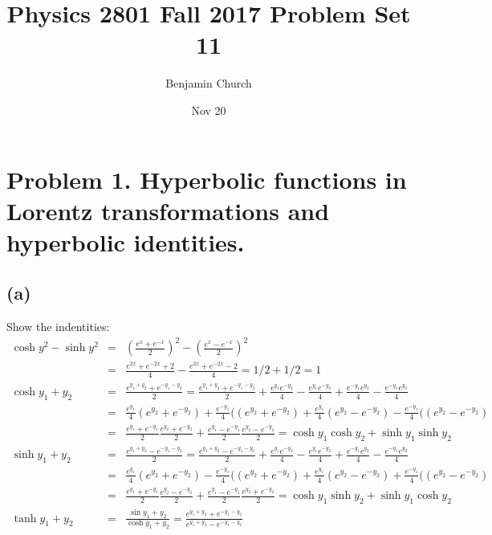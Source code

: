 \documentclass[11pt]{amsart}
\title{Physics 2801 Fall 2017 Problem Set 11}
\author{Benjamin Church}
\date{Nov 20} %
\begin{document}
\maketitle

\section*{Problem 1. Hyperbolic functions in Lorentz transformations and hyperbolic identities.}
\subsection*{(a)}
 Show the indentities: \\
\begin{eqnarray*}
\cosh{y}^{2}-\sinh{y}^{2} &=& (\frac{e^{x}+e^{-x}}{2})^{2}- (\frac{e^{x}-e^{-x}}{2})^{2} \\
&=& \frac{e^{2x}+e^{-2x}+2}{4}-\frac{e^{2x}+e^{-2x}-2}{4} = 1/2+1/2 = 1 \\
\cosh{y_{1}+y_{2}} &=& \frac{e^{y_{1}+y_{2}}+e^{-y_{1}-y_{2}}}{2} =  \frac{e^{y_{1}+y_{2}}+e^{-y_{1}-y_{2}}}{2}+\frac{e^{y_{1}}e^{-y_{2}}}{4}-\frac{e^{y_{1}}e^{-y_{2}}}{4} +\frac{e^{-y_{1}}e^{y_{2}}}{4} -\frac{e^{-y_{1}}e^{y_{2}}}{4}\\
&=& \frac{e^{y_{1}}}{4}(e^{y_{2}}+e^{-y_{2}})+\frac{e^{-y_{1}}}{4}((e^{y_{2}}+e^{-y_{2}})+\frac{e^{y_{1}}}{4}(e^{y_{2}}-e^{-y_{2}})-\frac{e^{-y_{1}}}{4}((e^{y_{2}}-e^{-y_{2}})\\
&=& \frac{e^{y_{1}}+e^{-y_{1}}}{2}\frac{e^{y_{2}}+e^{-y_{2}}}{2}+ \frac{e^{y_{1}}-e^{-y_{1}}}{2}\frac{e^{y_{2}}-e^{-y_{2}}}{2} = \cosh{y_{1}}\cosh{y_{2}}+\sinh{y_{1}}\sinh{y_{2}} \\
\sinh{y_{1}+y_{2}} &=& \frac{e^{y_{1}+y_{2}}-e^{-y_{1}-y_{2}}}{2} =  \frac{e^{y_{1}+y_{2}}-e^{-y_{1}-y_{2}}}{2}+\frac{e^{y_{1}}e^{-y_{2}}}{4}-\frac{e^{y_{1}}e^{-y_{2}}}{4} +\frac{e^{-y_{1}}e^{y_{2}}}{4} -\frac{e^{-y_{1}}e^{y_{2}}}{4}\\
&=& \frac{e^{y_{1}}}{4}(e^{y_{2}}+e^{-y_{2}})-\frac{e^{-y_{1}}}{4}((e^{y_{2}}+e^{-y_{2}})+\frac{e^{y_{1}}}{4}(e^{y_{2}}-e^{-y_{2}})+\frac{e^{-y_{1}}}{4}((e^{y_{2}}-e^{-y_{2}})\\
&=& \frac{e^{y_{1}}+e^{-y_{1}}}{2}\frac{e^{y_{2}}-e^{-y_{2}}}{2}+ \frac{e^{y_{1}}-e^{-y_{1}}}{2}\frac{e^{y_{2}}+e^{-y_{2}}}{2} = \cosh{y_{1}}\sinh{y_{2}}+\sinh{y_{1}}\cosh{y_{2}} \\
\tanh{y_{1}+y_{2}} &=& \frac{\sin{y_{1}+y_{2}}}{\cosh{y_{1}+y_{2}}} = \frac{e^{y_{1}+y_{2}}+e^{-y_{1}-y_{2}}}{e^{y_{1}+y_{2}}-e^{-y_{1}-y_{2}}} 
\end{eqnarray*} \\
\end{document}

